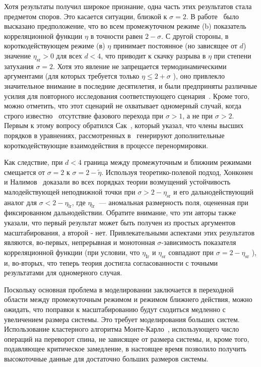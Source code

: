 Хотя результаты получил широкое признание, одна часть этих результатов стала предметом споров. Это касается ситуации, близкой к $\sigma=2$. В работе~\cite{10.1103/PhysRevLett.29.917} было высказано предположение, что во всем промежуточном режиме (b) показатель корреляционной функции $\eta$ в точности равен $2-\sigma$. С другой стороны, в короткодействующем режиме (в) $\eta$ принимает постоянное (но зависящее от $d$) значение $\eta_{\mathrm{sr}}>0$ для всех $d<4 $, что приводит к скачку разрыва в $\eta$ при степени затухания $\sigma=2$. Хотя это явление не запрещается термодинамическими аргументами (для которых требуется только $\eta\leq 2+\sigma$ ), оно привлекло значительное внимание в последние десятилетия, и были предприняты различные усилия для повторного исследования соответствующего сценария~\cite{10.1103/PhysRevB.8.281, 10.1088/0305-4470/22/6/024}. Кроме того, можно отметить, что этот сценарий не охватывает одномерный случай, когда строго известно~\cite{10.1007/BF01654281} отсутствие фазового перехода при $\sigma>1$, а не при $\sigma>2$. Первым к этому вопросу обратился Сак~\cite{10.1103/PhysRevB.8.281}, который указал, что члены высших порядков в уравнениях, рассмотренных в~\cite{10.1103/PhysRevLett.29.917} генерируют дополнительные короткодействующие взаимодействия в процессе перенормировки.

Как следствие, при $d<4$ граница между промежуточным и ближним режимами смещается от $\sigma=2$ к $\sigma=2-\tilde{\eta}$.
Используя теоретико-полевой подход, Хонконен и Налимов~\cite{10.1088/0305-4470/22/6/024} доказали во всех порядках теории возмущений устойчивость малодействующей неподвижной точки при $\sigma>2-\eta_{\mathrm{sr}}$ и его дальнодействующий аналог для $\sigma<2-\eta_{\mathrm{lr}}$, где $\eta_{\text {lr }}$ — аномальная размерность поля, оцененная при фиксированном дальнодействии. Обратите внимание, что эти авторы также указали, что первый результат может быть получен из простых аргументов масштабирования, а второй - нет. Привлекательными аспектами этих результатов являются, во-первых, непрерывная и монотонная $\sigma$-зависимость показателя корреляционной функции (при условии, что $\eta_{\mathrm{Ir}}$ и $\eta_{\mathrm{sr}}$ совпадают при $\sigma=2-\eta_{\mathrm{sr}}$ ), и, во-вторых, что теперь теория достигла согласованности с точными результатами для одномерного случая.

Поскольку основная проблема в моделировании заключается в переходной области между промежуточным режимом и режимом ближнего действия, можно ожидать, что поправки к масштабированию будут сходиться медленно с увеличением размера системы. Это требует моделирования больших систем. Использование кластерного алгоритма Монте-Карло~\cite{10.1142/S0129183195000265}, использующего число операций на переворот спина, не зависящее от размера системы, и, кроме того, подавляющее критическое замедление, в настоящее время позволило получить высокоточные данные для достаточно больших размеров системы.

